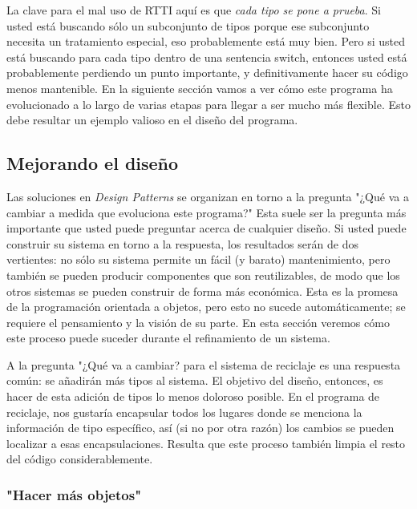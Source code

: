 \documentclass{article}
\begin{document}
La clave para el mal uso de RTTI aquí es que \textit{cada tipo se pone a prueba}. Si usted está buscando sólo un subconjunto de tipos porque ese subconjunto necesita un tratamiento especial, eso probablemente está muy bien. Pero si usted está buscando para cada tipo dentro de una sentencia switch, entonces usted está probablemente perdiendo un punto importante, y definitivamente hacer su código menos mantenible. En la siguiente sección vamos a ver cómo este programa ha evolucionado a lo largo de varias etapas para llegar a ser mucho más flexible. Esto debe resultar un ejemplo valioso en el diseño del programa.     \newline

\subsection{Mejorando el diseño}

Las soluciones en \textit{Design Patterns} se organizan en torno a la pregunta "¿Qué va a cambiar a medida que evoluciona este programa?" Esta suele ser la pregunta más importante que usted puede preguntar acerca de cualquier diseño. Si usted puede construir su sistema en torno a la respuesta, los resultados serán de dos vertientes: no sólo su sistema permite un fácil (y barato) mantenimiento, pero también se pueden producir componentes que son reutilizables, de modo que los otros sistemas se pueden construir de forma más económica. Esta es la promesa de la programación orientada a objetos, pero esto no sucede automáticamente; se requiere el pensamiento y la visión de su parte. En esta sección veremos cómo este proceso puede suceder durante el refinamiento de un sistema.    \newline


A la pregunta "¿Qué va a cambiar? para el sistema de reciclaje es una respuesta común: se añadirán más tipos al sistema. El objetivo del diseño, entonces, es hacer de esta adición de tipos lo menos doloroso posible. En el programa de reciclaje, nos gustaría encapsular todos los lugares donde se menciona la información de tipo específico, así (si no por otra razón) los cambios se pueden localizar a esas encapsulaciones. Resulta que este proceso también limpia el resto del código considerablemente.  \newline

\subsubsection{"Hacer más objetos"}
\end{document}
